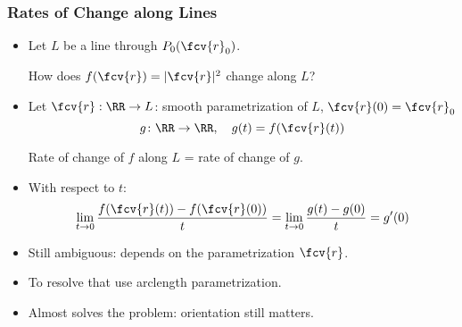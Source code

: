 \begin{frame}
  \frametitle{Rates of Change along Lines}
\begin{itemize}
\item Let $L$ be a line through $P_0(\fcv{r}_0)$.
\begin{center}  How does $f(\fcv{r}) = |\fcv{r}|^2$ change \alert<1->{along $L$}?  
\end{center}
\item<2-> Let $\fcv{r} : \RR \to L$: smooth parametrization of $L$, $\fcv{r}(0) = \fcv{r}_0$
$$g\colon \RR \to \RR, \quad g(t) = f(\fcv{r}(t))$$
\begin{center}
Rate of change of $f$ along $L$ = rate of change of $g$.
\end{center}
\item<3-> With respect to $t$:
$$\lim_{t\to 0} \frac{f(\fcv{r}(t))-f(\fcv{r}(0))}{t} =\lim_{t\to 0} \frac{g(t)-g(0)}{t} = g'(0)$$
\item<4-> Still ambiguous: depends on the parametrization $\fcv{r}$.
\item<5-> To resolve that use arclength parametrization.
\item<6-> Almost solves the problem: orientation still matters.
\end{itemize}
\end{frame}
